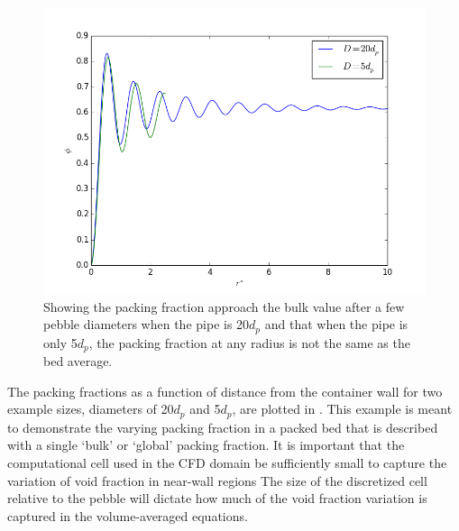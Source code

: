 \begin{figure}[htbp]
\centering
	\includegraphics[width = \singleimagewidth]{figures/annular-packing-fraction.png}
	\caption{Showing the packing fraction approach the bulk value after a few pebble diameters when the pipe is 20$d_p$ and that when the pipe is only 5$d_p$, the packing fraction at any radius is not the same as the bed average.}
	\label{fig:packingDist}
\end{figure}

The packing fractions as a function of distance from the container wall for two example sizes, diameters of 20$d_p$ and 5$d_p$, are plotted in . This example is meant to demonstrate the varying packing fraction in a packed bed that is described with a single `bulk' or `global' packing fraction. It is important that the computational cell used in the CFD domain be sufficiently small to capture the variation of void fraction in near-wall regions  The size of the discretized cell relative to the pebble will dictate how much of the void fraction variation is captured in the volume-averaged equations.




\FloatBarrier



